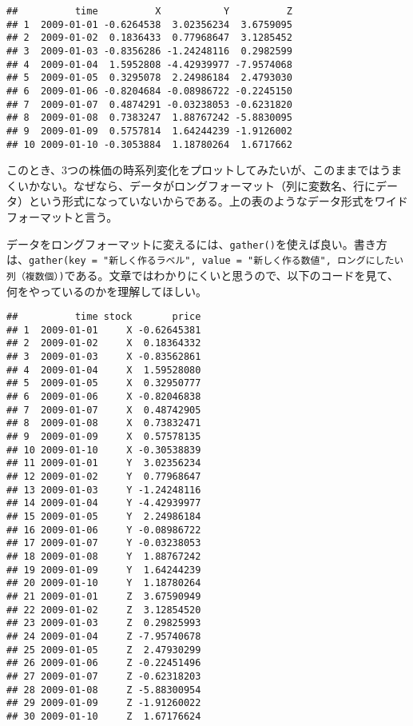 \documentclass[]{book}
\newenvironment{Shaded}{\begin{snugshade}}{\end{snugshade}}
\newcommand{\KeywordTok}[1]{\textcolor[rgb]{0.13,0.29,0.53}{\textbf{#1}}}
\newcommand{\DataTypeTok}[1]{\textcolor[rgb]{0.13,0.29,0.53}{#1}}
\newcommand{\StringTok}[1]{\textcolor[rgb]{0.31,0.60,0.02}{#1}}
\newcommand{\CommentTok}[1]{\textcolor[rgb]{0.56,0.35,0.01}{\textit{#1}}}
\newcommand{\OperatorTok}[1]{\textcolor[rgb]{0.81,0.36,0.00}{\textbf{#1}}}
\newcommand{\NormalTok}[1]{#1}
\begin{document}
\begin{verbatim}
##          time          X           Y          Z
## 1  2009-01-01 -0.6264538  3.02356234  3.6759095
## 2  2009-01-02  0.1836433  0.77968647  3.1285452
## 3  2009-01-03 -0.8356286 -1.24248116  0.2982599
## 4  2009-01-04  1.5952808 -4.42939977 -7.9574068
## 5  2009-01-05  0.3295078  2.24986184  2.4793030
## 6  2009-01-06 -0.8204684 -0.08986722 -0.2245150
## 7  2009-01-07  0.4874291 -0.03238053 -0.6231820
## 8  2009-01-08  0.7383247  1.88767242 -5.8830095
## 9  2009-01-09  0.5757814  1.64244239 -1.9126002
## 10 2009-01-10 -0.3053884  1.18780264  1.6717662
\end{verbatim}

このとき、3つの株価の時系列変化をプロットしてみたいが、このままではうまくいかない。なぜなら、データがロングフォーマット（列に変数名、行にデータ）という形式になっていないからである。上の表のようなデータ形式をワイドフォーマットと言う。

データをロングフォーマットに変えるには、\texttt{gather()}を使えば良い。書き方は、\texttt{gather(key\ =\ "新しく作るラベル",\ value\ =\ "新しく作る数値",\ ロングにしたい列（複数個）)}である。文章ではわかりにくいと思うので、以下のコードを見て、何をやっているのかを理解してほしい。

\begin{Shaded}
\end{Shaded}

\begin{verbatim}
##          time stock       price
## 1  2009-01-01     X -0.62645381
## 2  2009-01-02     X  0.18364332
## 3  2009-01-03     X -0.83562861
## 4  2009-01-04     X  1.59528080
## 5  2009-01-05     X  0.32950777
## 6  2009-01-06     X -0.82046838
## 7  2009-01-07     X  0.48742905
## 8  2009-01-08     X  0.73832471
## 9  2009-01-09     X  0.57578135
## 10 2009-01-10     X -0.30538839
## 11 2009-01-01     Y  3.02356234
## 12 2009-01-02     Y  0.77968647
## 13 2009-01-03     Y -1.24248116
## 14 2009-01-04     Y -4.42939977
## 15 2009-01-05     Y  2.24986184
## 16 2009-01-06     Y -0.08986722
## 17 2009-01-07     Y -0.03238053
## 18 2009-01-08     Y  1.88767242
## 19 2009-01-09     Y  1.64244239
## 20 2009-01-10     Y  1.18780264
## 21 2009-01-01     Z  3.67590949
## 22 2009-01-02     Z  3.12854520
## 23 2009-01-03     Z  0.29825993
## 24 2009-01-04     Z -7.95740678
## 25 2009-01-05     Z  2.47930299
## 26 2009-01-06     Z -0.22451496
## 27 2009-01-07     Z -0.62318203
## 28 2009-01-08     Z -5.88300954
## 29 2009-01-09     Z -1.91260022
## 30 2009-01-10     Z  1.67176624
\end{verbatim}
\end{document}
